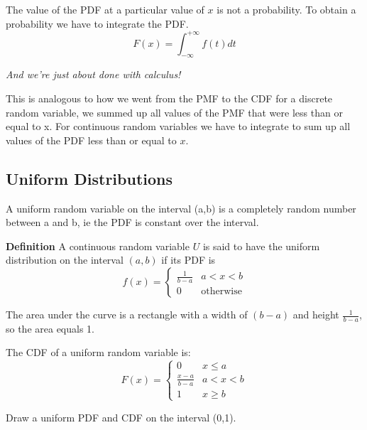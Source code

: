 \documentclass[]{article}
\begin{document}
The value of the PDF at a particular value of $x$ is not a probability. To obtain a probability we have to integrate the PDF.
\begin{equation}
F(x) = \int_{-\infty}^{+\infty} f(t) dt
\end{equation}

\vspace{0.1in}
\begin{center}
\emph{And we're just about done with calculus!}
\end{center}
\vspace{0.1in}

This is analogous to how we went from the PMF to the CDF for a discrete random variable, we summed up all values of the PMF that were less than or equal to x. For continuous random variables we have to integrate to sum up all values of the PDF less than or equal to $x$.

\subsection{Uniform Distributions}

A uniform random variable on the interval (a,b) is a completely random
number between a and b, ie the PDF is constant over the interval.

\textbf{Definition} A continuous random variable $U$ is said to have the uniform distribution on the interval $(a,b)$ if its PDF is
\begin{equation}
f(x) = 
	\begin{cases} 
		\frac{1}{b-a} & a < x < b \\
		0 & \textrm{otherwise} 
   \end{cases}
\end{equation}

\vspace{0.1in}
The area under the curve is a rectangle with a width of $(b-a)$ and height $\frac{1}{b-a}$, so the area equals 1.
\vspace{0.1in}

The CDF of a uniform random variable is:
\begin{equation}
F(x) = 
	\begin{cases} 
		0 & x \leq a \\
		\frac{x-a}{b-a} & a < x < b \\
		1 & x \geq b 
   \end{cases}
\end{equation}

Draw a uniform PDF and CDF on the interval (0,1).
\end{document}
